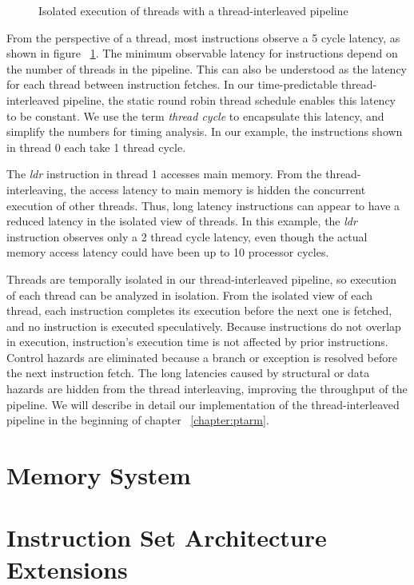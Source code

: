 \begin{figure}[h]
\begin{center}
\noindent{}
\end{center}
\vspace{-3mm}
\caption{Isolated execution of threads with a thread-interleaved pipeline}
\label{fig:thread_isolated_execution}
\end{figure}

From the perspective of a thread, most instructions observe a 5 cycle latency, as shown in figure ~\ref{fig:thread_isolated_execution}. 
The minimum observable latency for instructions depend on the number of threads in the pipeline. 
This can also be understood as the latency for each thread between instruction fetches.
In our time-predictable thread-interleaved pipeline, the static round robin thread schedule enables this latency to be constant.  
We use the term \emph{thread cycle} to encapsulate this latency, and simplify the numbers for timing analysis. 
In our example, the instructions shown in thread 0 each take 1 thread cycle.

The \emph{ldr} instruction in thread 1 accesses main memory.
From the thread-interleaving, the access latency to main memory is hidden the concurrent execution of other threads. 
Thus, long latency instructions can appear to have a reduced latency in the isolated view of threads.
In this example, the \emph{ldr} instruction observes only a 2 thread cycle latency, even though the actual memory access latency could have been up to 10 processor cycles. 

Threads are temporally isolated in our thread-interleaved pipeline, so execution of each thread can be analyzed in isolation.
From the isolated view of each thread, each instruction completes its execution before the next one is fetched, and no instruction is executed speculatively.
Because instructions do not overlap in execution, instruction's execution time is not affected by prior instructions.
Control hazards are eliminated because a branch or exception is resolved before the next instruction fetch. 
The long latencies caused by structural or data hazards are hidden from the thread interleaving, improving the throughput of the pipeline.    
We will describe in detail our implementation of the thread-interleaved pipeline in the beginning of chapter ~\ref{chapter:ptarm}.

\section{Memory System}
\label{section:memory_system}


\section{Instruction Set Architecture Extensions}
\label{sec:programming_models}

